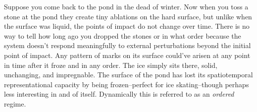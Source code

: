 Suppose you come back to the pond in the dead of winter. Now when you toss a stone at the pond they create tiny ablations on the hard surface, but unlike when the surface was liquid, the points of impact do not change over time. There is no way to tell how long ago you dropped the stones or in what order because the system doesn't respond meaningfully to external perturbations beyond the initial point of impact. Any pattern of marks on its surface could've arisen at any point in time after it froze and in any order. The ice simply sits there, solid, unchanging, and impregnable. The surface of the pond has lost its spatiotemporal representational capacity by being frozen--perfect for ice skating--though perhaps less interesting in and of itself. Dynamically this is referred to as an \emph{ordered} regime.



